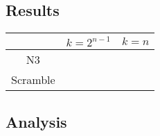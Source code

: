 \subsection{Results}
\label{Exp:Res}

\begin{table}[t]
  \begin{center}
    \scalebox{1.2} {
      \begin{tabular}{c|c|c}\hline
        & $k=2^{n-1}$ & $k=n$ \\\hline
        N3       &             &       \\\hline
        Scramble &             &       \\\hline
      \end{tabular}
    }
  \end{center}
\end{table}

\subsection{Analysis}
\label{Exp:An}
